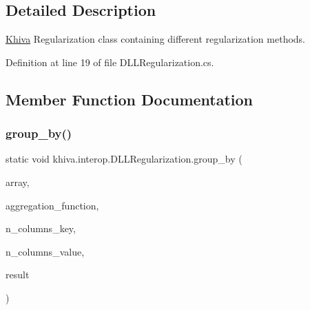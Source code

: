 \subsection{Detailed Description}
\mbox{\hyperlink{classkhiva_1_1_khiva}{Khiva}} Regularization class containing different regularization methods. 



Definition at line 19 of file D\+L\+L\+Regularization.\+cs.



\subsection{Member Function Documentation}
\mbox{\label{classkhiva_1_1interop_1_1_d_l_l_regularization_a10e0bd8ee9417e34f6e40027bc3e3f38}} 
\subsubsection{\texorpdfstring{group\+\_\+by()}{group\_by()}}
{\footnotesize\ttfamily static void khiva.\+interop.\+D\+L\+L\+Regularization.\+group\+\_\+by (\begin{DoxyParamCaption}\item[{\mbox{[}\+In\mbox{]} ref Int\+Ptr}]{array,  }\item[{\mbox{[}\+In\mbox{]} ref int}]{aggregation\+\_\+function,  }\item[{\mbox{[}\+In\mbox{]} ref int}]{n\+\_\+columns\+\_\+key,  }\item[{\mbox{[}\+In\mbox{]} ref int}]{n\+\_\+columns\+\_\+value,  }\item[{\mbox{[}\+Out\mbox{]} out Int\+Ptr}]{result }\end{DoxyParamCaption})\hspace{0.3cm}{\ttfamily [static]}}



